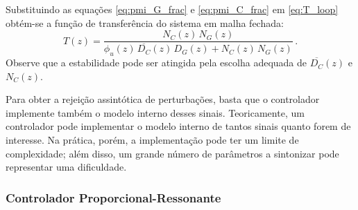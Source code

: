 \documentclass[repeatfields,oneside,overleaf]{tcc}
\newcommand{\mycdot}{ \, }
\begin{document}


Substituindo as equações \eqref{eq:pmi_G_frac} e \eqref{eq:pmi_C_frac} em \eqref{eq:T_loop} obtém-se a função de transferência do sistema em malha fechada:
\begin{equation}\label{eq:pmi_T}
    T(z) = \dfrac{ N_C(z) \mycdot N_G(z) }{ \phi_u(z) \mycdot \overline{D_C}(z) \mycdot D_G(z) + N_C(z) \mycdot N_G(z) }
    \,.
\end{equation}
Observe que a estabilidade pode ser atingida pela escolha adequada de $\overline{D_C}(z)$ e $N_C(z)$.

Para obter a rejeição assintótica de perturbações, basta que o controlador implemente também o modelo interno desses sinais.
Teoricamente, um controlador pode implementar o modelo interno de tantos sinais quanto forem de interesse.
Na prática, porém, a implementação pode ter um limite de complexidade;
além disso, um grande número de parâmetros a sintonizar pode representar uma dificuldade.


\subsubsection{Controlador Proporcional-Ressonante}\label{sec:controle_PR}
\end{document}
